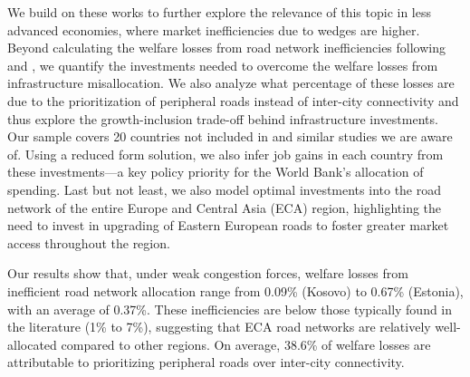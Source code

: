 \documentclass[a4paper]{article}
\begin{document}
We build on these works to further explore the relevance of this topic in less advanced economies, where market inefficiencies due to wedges are higher. 
Beyond calculating the welfare losses from road network inefficiencies following \citet{fajgelbaum2020optimal} and \citet{graff2024spatial}, we quantify the investments needed to overcome the welfare losses from infrastructure misallocation. We also analyze what percentage of these losses are due to the prioritization of peripheral roads instead of inter-city connectivity and thus explore the growth-inclusion trade-off behind infrastructure investments. Our sample covers 20 countries not included in \citet{fajgelbaum2020optimal} and similar studies we are aware of. Using a reduced form solution, we also infer job gains in each country from these investments---a key policy priority for the World Bank's allocation of spending. Last but not least, we also model optimal investments into the road network of the entire Europe and Central Asia (ECA) region, highlighting the need to invest in upgrading of Eastern European roads to foster greater market access throughout the region. \newline %


Our results show that, under weak congestion forces, welfare losses from inefficient road network allocation range from 0.09\% (Kosovo) to 0.67\% (Estonia), with an average of 0.37\%. These inefficiencies are below those typically found in the literature (1\% to 7\%), suggesting that ECA road networks are relatively well-allocated compared to other regions. On average, 38.6\% of welfare losses are attributable to prioritizing peripheral roads over inter-city connectivity. \newline
\end{document}
